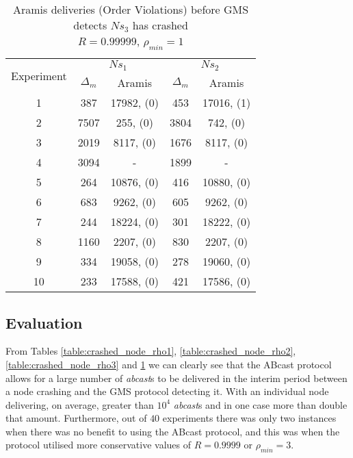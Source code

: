 \begin{table}[p]
    \begin{center}
        \renewcommand{\arraystretch}{1.25}
        \begin{tabular}{|c|c|c|c|c|}
            \hline
            \multirow{2}{*}{Experiment} & \multicolumn{2}{|c|}{$Ns_1$} & \multicolumn{2}{|c|}{$Ns_2$} \\ \cline{2-5}
                                                       & $\Delta_m$&\textsf{Aramis} & $\Delta_m$&\textsf{Aramis} \\ \hline \hline
            1 & 387 & 17982, (0) & 453 & 17016, (1)  \\ \hline
            2 & 7507 & 255, (0) & 3804 & 742, (0)  \\ \hline
            3 & 2019 & 8117, (0) & 1676 & 8117, (0)  \\ \hline
            4 & 3094 & - & 1899 & -  \\ \hline
            5 & 264 & 10876, (0) & 416 & 10880, (0)  \\ \hline
            6 & 683 & 9262, (0) & 605 & 9262, (0)  \\ \hline
            7 & 244 & 18224, (0) & 301 & 18222, (0)  \\ \hline
            8 & 1160 & 2207, (0) & 830 & 2207, (0)  \\ \hline
            9 & 334 & 19058, (0) & 278 & 19060, (0)  \\ \hline
            10 & 233 & 17588, (0) & 421 & 17586, (0)  \\ \hline
        \end{tabular}
        \caption[\textsf{Aramis} deliveries before GMS detects node crash ($R=0.99999$, $\rho_{min}=1$)]{\textsf{Aramis} deliveries (Order Violations) before GMS detects $Ns_3$ has crashed \\ $R=0.99999$, $\rho_{min}=1$}
        \label{table:crashed_node_R.99999}
    \end{center}
\end{table}

    \subsection{Evaluation}
    From Tables \ref{table:crashed_node_rho1}, \ref{table:crashed_node_rho2},  \ref{table:crashed_node_rho3} and \ref{table:crashed_node_R.99999} we can clearly see that the \textsf{ABcast} protocol allows for a large number of \emph{abcast}s to be delivered in the interim period between a node crashing and the GMS protocol detecting it.  With an individual node delivering, on average, greater than $10^4$ \emph{abcast}s and in one case more than double that amount.  Furthermore, out of $40$ experiments there was only two instances when there was no benefit to using the \textsf{ABcast} protocol, and this was when the protocol utilised more conservative values of $R=0.9999$ or $\rho_{min}=3$.  
    
